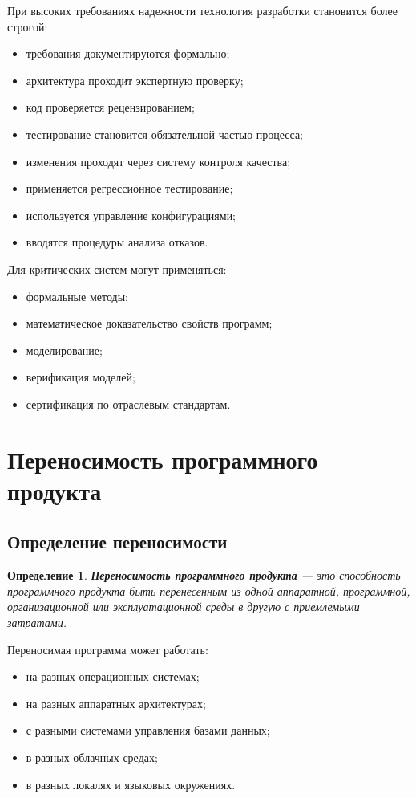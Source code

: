 \documentclass[12pt,a4paper]{article}
\newtheorem{definition}{Определение}
\begin{document}
При высоких требованиях надежности технология разработки становится более строгой:
\begin{itemize}
    \item требования документируются формально;
    \item архитектура проходит экспертную проверку;
    \item код проверяется рецензированием;
    \item тестирование становится обязательной частью процесса;
    \item изменения проходят через систему контроля качества;
    \item применяется регрессионное тестирование;
    \item используется управление конфигурациями;
    \item вводятся процедуры анализа отказов.
\end{itemize}

Для критических систем могут применяться:
\begin{itemize}
    \item формальные методы;
    \item математическое доказательство свойств программ;
    \item моделирование;
    \item верификация моделей;
    \item сертификация по отраслевым стандартам.
\end{itemize}

\section{Переносимость программного продукта}

\subsection{Определение переносимости}

\begin{definition}
\textbf{Переносимость программного продукта} --- это способность программного продукта быть перенесенным из одной аппаратной, программной, организационной или эксплуатационной среды в другую с приемлемыми затратами.
\end{definition}

Переносимая программа может работать:
\begin{itemize}
    \item на разных операционных системах;
    \item на разных аппаратных архитектурах;
    \item с разными системами управления базами данных;
    \item в разных облачных средах;
    \item в разных локалях и языковых окружениях.
\end{itemize}
\end{document}
